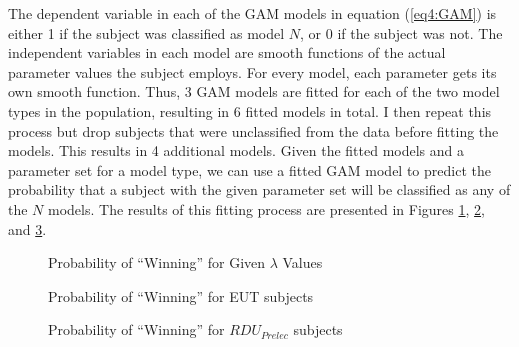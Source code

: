 \documentclass[../main.tex]{subfiles}
\begin{document}
The dependent variable in each of the GAM models in equation (\ref{eq4:GAM}) is either 1 if the subject was classified as model $N$, or 0 if the subject was not.
The independent variables in each model are smooth functions of the actual parameter values the subject employs.
For every model, each parameter gets its own smooth function.
Thus, 3 GAM models are fitted for each of the two model types in the population, resulting in 6 fitted models in total.
I then repeat this process but drop subjects that were unclassified from the data before fitting the models.
This results in 4 additional models.
Given the fitted models and a parameter set for a model type, we can use a fitted GAM model to predict the probability that a subject with the given parameter set will be classified as any of the $N$ models.
The results of this fitting process are presented in Figures \ref{fig:HN1_win_mu}, \ref{fig:HN1_win_eut}, and \ref{fig:HN1_win_pre}.

\begin{figure}[h!]
	\center
	\caption{Probability of \enquote{Winning} for Given $\lambda$ Values}
	\label{fig:HN1_win_mu}
\end{figure}

\begin{figure}[h!]
	\center
	\caption{Probability of \enquote{Winning} for EUT subjects}
	\label{fig:HN1_win_eut}
\end{figure}

\begin{figure}[h!]
	\center
	\caption{Probability of \enquote{Winning} for $\mathit{RDU_{Prelec}}$ subjects}
	\label{fig:HN1_win_pre}
\end{figure}
\end{document}
